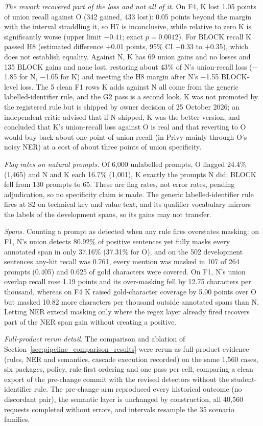 \documentclass[sigconf]{acmart}
\theoremstyle{acmdefinition}\newtheorem{property}{Property}
\begin{document}
\textit{The rework recovered part of the loss and not all of it.} On F4, K lost 1.05 points of union recall against O (342 gained, 433 lost): 0.05 points beyond the margin with the interval straddling it, so H7 is inconclusive, while relative to zero K is significantly worse (upper limit $-0.41$; exact $p=0.0012$). For BLOCK recall K passed H8 (estimated difference $+$0.01 points, 95\% CI $-$0.33 to $+$0.35), which does not establish equality. Against N, K has 69 union gains and no losses and 135 BLOCK gains and none lost, restoring about 43\% of N's union-recall loss ($-$1.85 for N, $-$1.05 for K) and meeting the H8 margin after N's $-$1.55 BLOCK-level loss. The 5 clean F1 rows K adds against N all come from the generic labelled-identifier rule, and the G2 pass is a second look. K was not promoted by the registered rule but is shipped by owner decision of 25 October 2026; an independent critic advised that if N shipped, K was the better version, and concluded that K's union-recall loss against O is real and that reverting to O would buy back about one point of union recall (in Privy mainly through O's noisy NER) at a cost of about three points of union specificity.

\textit{Flag rates on natural prompts.} Of 6,000 unlabelled prompts, O flagged 24.4\% (1,465) and N and K each 16.7\% (1,001), K exactly the prompts N did; BLOCK fell from 130 prompts to 65. These are flag rates, not error rates, pending adjudication, so no specificity claim is made. The generic labelled-identifier rule fires at S2 on technical key and value text, and its qualifier vocabulary mirrors the labels of the development spans, so its gains may not transfer.

\textit{Spans.} Counting a prompt as detected when any rule fires overstates masking: on F1, N's union detects 80.92\% of positive sentences yet fully masks every annotated span in only 37.16\% (37.31\% for O), and on the 502 development sentences any-hit recall was 0.761, every mention was masked in 107 of 264 prompts (0.405) and 0.625 of gold characters were covered. On F1, N's union overlap recall rose 1.19 points and its over-masking fell by 12.75 characters per thousand, whereas on F4 K raised gold-character coverage by 5.00 points over O but masked 10.82 more characters per thousand outside annotated spans than N. Letting NER extend masking only where the regex layer already fired recovers part of the NER span gain without creating a positive.

\textit{Full-product rerun detail.} The comparison and ablation of Section~\ref{sec:pipeline_comparison_results} were rerun as full-product evidence (rules, NER and semantics, cascade execution recorded) on the same 1,560 cases, six packages, policy, rule-first ordering and one pass per cell, comparing a clean export of the pre-change commit with the revised detectors without the student-identifier rule. The pre-change arm reproduced every historical outcome (no discordant pair), the semantic layer is unchanged by construction, all 40,560 requests completed without errors, and intervals resample the 35 scenario families.
\end{document}
